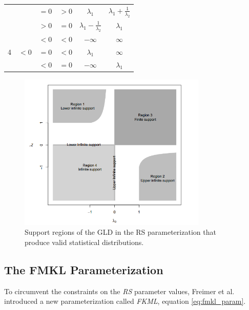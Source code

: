 \begin{table}[]
\begin{tabular}{c|c|c|c|c|c}
                   &                       & $=0$               & $>0$               & $\lambda_{1}$                                        & $\lambda_{1}+\frac{1}{\lambda_{2}}$                  \\
                   &                       & $>0$               & $=0$               & $\lambda_{1}-\frac{1}{\lambda_{2}}$                  & $\lambda_{1}$                                        \\ \hline
\multirow{3}{*}{4} & \multirow{3}{*}{$<0$} & $<0$               & $<0$               & $-\infty$                                            & $\infty$                                             \\
                   &                       & $=0$               & $<0$               & $\lambda_{1}$                                        & $\infty$                                             \\
                   &                       & $<0$               & $=0$               & $-\infty$                                            & $\lambda_{1}$                                        \\ \hline
\end{tabular}
\end{table}

\begin{figure}[H]
    \centering
    \includegraphics[width=0.8\textwidth]{img/gld/rs_regions.png}
    \caption{Support regions of the GLD in the RS parameterization that produce valid statistical
distributions.}
    \label{fig:rs_regions}
\end{figure}

\subsection{The FMKL Parameterization}\label{sec:fmkl_gld}
To circumvent the constraints on the \textit{RS} parameter values, Freimer et al. \cite{Freimer1988} introduced a new parameterization called \textit{FKML}, equation \ref{eq:fmkl_param}.

